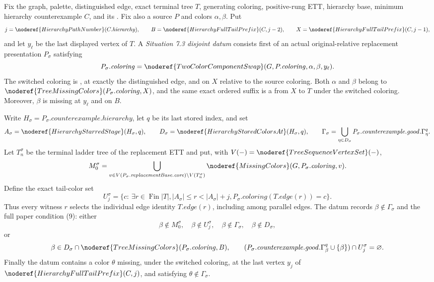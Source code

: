 \begin{definition}
Fix the graph, palette, distinguished edge, exact terminal tree \(T\),
generating coloring, positive-rung ETT, hierarchy base, minimum hierarchy
counterexample \(C\), and its
.  Fix also a source
 \(P\) and colors
\(\alpha,\beta\).  Put
\[
 j=\noderef{HierarchyPathNumber}(C.\mathit{hierarchy}),\qquad
 B=\noderef{HierarchyFullTailPrefix}(C,j-2),\qquad
 X=\noderef{HierarchyFullTailPrefix}(C,j-1),
\]
and let \(y_\ell\) be the last displayed vertex of \(T\).  A
\emph{Situation 7.3 disjoint datum} consists first of an actual
original-relative replacement presentation \(P_\sigma\) satisfying
\[
 P_\sigma.\mathit{coloring}
 =\noderef{TwoColorComponentSwap}
   (G,P.\mathit{coloring},\alpha,\beta,y_\ell).
\]
The switched coloring is
,
 at exactly the distinguished edge, and
 on \(X\) relative to the source coloring.
Both \(\alpha\) and \(\beta\) belong to
\(\noderef{TreeMissingColors}(P_\sigma.\mathit{coloring},X)\), and the
same exact ordered suffix is a
 from \(X\) to \(T\) under the
switched coloring.  Moreover, \(\beta\) is missing at \(y_\ell\) and on
\(B\).

Write \(H_\sigma=P_\sigma.\mathit{counterexample.hierarchy}\), let \(q\)
be its last stored index, and set
\[
 A_\sigma=\noderef{HierarchyStarredStage}(H_\sigma,q),\qquad
 D_\sigma=\noderef{HierarchyStoredColorsAt}(H_\sigma,q),\qquad
 \Gamma_\sigma=\bigcup_{\eta\in D_\sigma}
 P_\sigma.\mathit{counterexample.good}.\Gamma^q_\eta.
\]
Let \(T_n^\sigma\) be the terminal ladder tree of the replacement ETT and
put, with \(V(-)=\noderef{TreeSequenceVertexSet}(-)\),
\[
 M_0^\sigma=
 \bigcup_{v\in
 V(P_\sigma.\mathit{replacementBase.core})\setminus V(T_n^\sigma)}
 \noderef{MissingColors}(G,P_\sigma.\mathit{coloring},v).
\]
Define the exact tail-color set
\[
 U_j^\sigma=\{c:\ \exists r\in\operatorname{Fin}|T|,
 |A_\sigma|\le r<|A_\sigma|+j,
 P_\sigma.\mathit{coloring}(T.\mathit{edge}(r))=c\}.
\]
Thus every witness \(r\) selects the individual edge identity
\(T.\mathit{edge}(r)\), including among parallel edges.  The datum records
\(\beta\notin\Gamma_\sigma\) and the full paper condition (9): either
\[
 \beta\notin M_0^\sigma,\quad \beta\notin U_j^\sigma,
 \quad\beta\notin\Gamma_\sigma,\quad\beta\notin D_\sigma,
\]
or
\[
 \beta\in D_\sigma\cap
 \noderef{TreeMissingColors}(P_\sigma.\mathit{coloring},B),\qquad
 (P_\sigma.\mathit{counterexample.good}.\Gamma^q_\beta\cup\{\beta\})
       \cap U_j^\sigma=\varnothing.
\]
Finally the datum contains a color \(\theta\) missing, under the switched
coloring, at the last vertex \(y_j\) of
\(\noderef{HierarchyFullTailPrefix}(C,j)\), and satisfying
\(\theta\notin\Gamma_\sigma\).
\end{definition}
